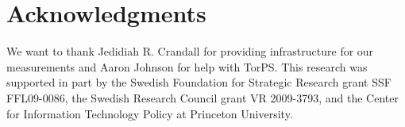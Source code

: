 \section*{Acknowledgments}
We want to thank Jedidiah R. Crandall for providing infrastructure for our
measurements and Aaron Johnson for help with TorPS.
%
This research was supported in part by the Swedish Foundation for Strategic
Research grant SSF FFL09-0086, the Swedish Research Council grant VR 2009-3793,
and the Center for Information Technology Policy at Princeton University.
